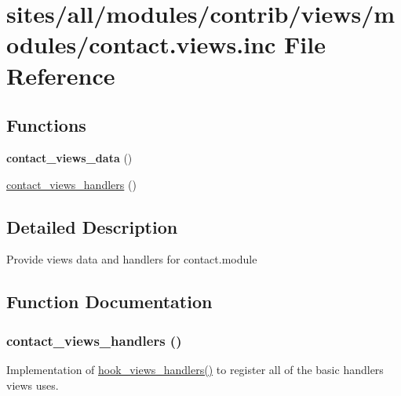 \hypertarget{contact_8views_8inc}{
\section{sites/all/modules/contrib/views/modules/contact.views.inc File Reference}
\label{contact_8views_8inc}
}
\subsection*{Functions}
\begin{CompactItemize}
\item 
\hypertarget{contact_8views_8inc_35d20a778620b87d750fe6ce88a00c61}{
\textbf{contact\_\-views\_\-data} ()}
\label{contact_8views_8inc_35d20a778620b87d750fe6ce88a00c61}

\item 
\hyperlink{contact_8views_8inc_4b05d4e5f5a0adb6330d34aec98794b4}{contact\_\-views\_\-handlers} ()
\end{CompactItemize}


\subsection{Detailed Description}
Provide views data and handlers for contact.module 

\subsection{Function Documentation}
\hypertarget{contact_8views_8inc_4b05d4e5f5a0adb6330d34aec98794b4}{
\subsubsection[{contact\_\-views\_\-handlers}]{\setlength{\rightskip}{0pt plus 5cm}contact\_\-views\_\-handlers ()}}
\label{contact_8views_8inc_4b05d4e5f5a0adb6330d34aec98794b4}


Implementation of \hyperlink{group__views__hooks_gbf506f44bd8d8a86876f27396f5341ed}{hook\_\-views\_\-handlers()} to register all of the basic handlers views uses. 